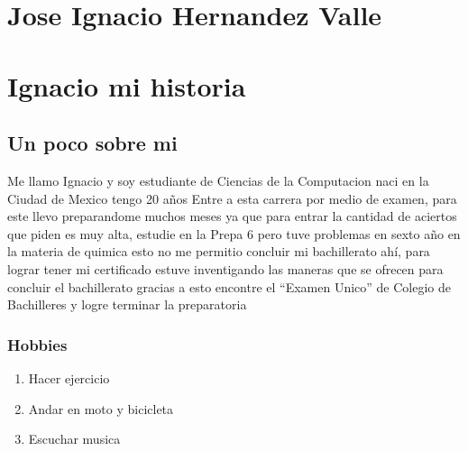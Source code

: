 

\maketitle

\listoffigures
{}


\chapter*{Jose Ignacio Hernandez Valle}


\chapter{Ignacio mi historia}
\section{Un poco sobre mi}

Me llamo Ignacio y soy estudiante de Ciencias de la Computacion naci en la Ciudad de Mexico tengo 20 años
Entre a esta carrera por medio de examen, para este llevo preparandome muchos meses ya que para entrar la cantidad de aciertos que piden es muy alta, estudie en la Prepa 6 pero tuve problemas en sexto año en la materia de quimica esto no me permitio concluir mi bachillerato ahí, para lograr tener mi certificado estuve inventigando las maneras que se ofrecen para concluir el bachillerato gracias a esto encontre el ``Examen Unico'' de Colegio de Bachilleres y logre terminar la preparatoria

\subsection{Hobbies}
\begin{enumerate}
  
\item Hacer ejercicio
\item Andar en moto y bicicleta
\item Escuchar musica
\end{enumerate}

